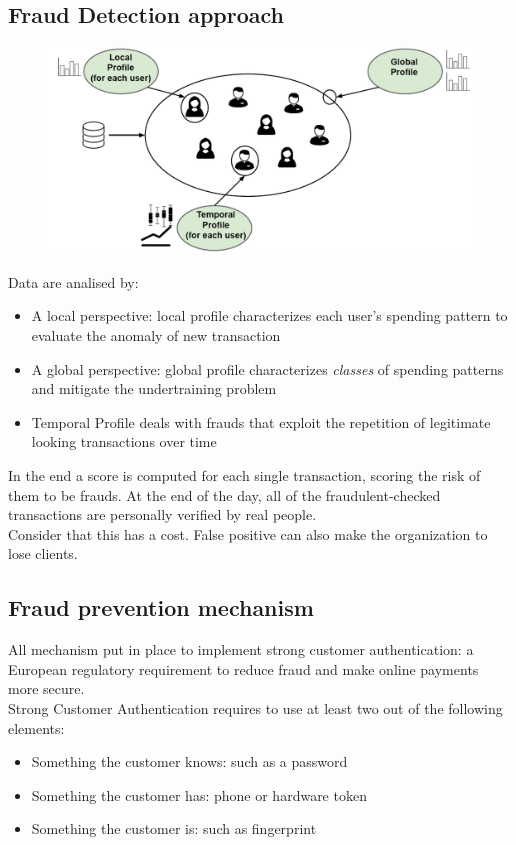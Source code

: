     \subsection{Fraud Detection approach}
        \begin{figure}[!ht]
            \centering
            \includegraphics[width=0.45\linewidth]{fraudanalysis.png}
        \end{figure}
        Data are analised by:
        \begin{itemize}
            \item A local perspective: local profile characterizes each user's spending pattern to evaluate the anomaly of new transaction
            \item A global perspective: global profile characterizes \textit{classes} of spending patterns and mitigate the undertraining problem 
            \item Temporal Profile deals with frauds that exploit the repetition of legitimate looking transactions over time 
        \end{itemize}
        In the end a score is computed for each single transaction, scoring the risk of them to be frauds. At the end of the day, all of the fraudulent-checked transactions are personally verified by real people.\\
        Consider that this has a cost. False positive can also make the organization to lose clients.
    \subsection{Fraud prevention mechanism}
        All mechanism put in place to implement strong customer authentication: a European regulatory requirement to reduce fraud and make online payments more secure.\\
        Strong Customer Authentication requires to use at least two out of the following elements:
        \begin{itemize}
            \item Something the customer knows: such as a password
            \item Something the customer has: phone or hardware token 
            \item Something the customer is: such as fingerprint
        \end{itemize}
